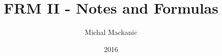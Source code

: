 \documentclass[a4paper]{book}
\begin{document}
\title{FRM II - Notes and Formulas}
\author{Michal Mackanic}
\date{2016}
\maketitle

\tableofcontents




\end{document}
